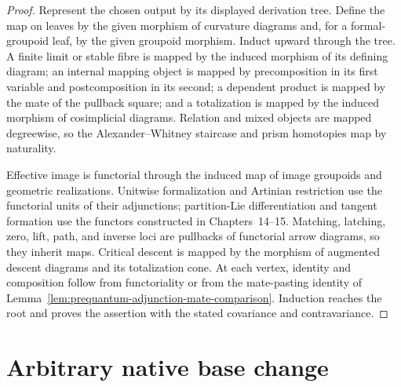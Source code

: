 \begin{proof}
Represent the chosen output by its displayed derivation tree.  Define the map on
leaves by the given morphism of curvature diagrams and, for a formal-groupoid
leaf, by the given groupoid morphism.  Induct upward through the tree.  A finite
limit or stable fibre is mapped by the induced morphism of its defining diagram;
an internal mapping object is mapped by precomposition in its first variable and
postcomposition in its second; a dependent product is mapped by the mate of the
pullback square; and a totalization is mapped by the induced morphism of
cosimplicial diagrams.  Relation and mixed objects are mapped degreewise, so the
Alexander--Whitney staircase and prism homotopies map by naturality.

Effective image is functorial through the induced map of image groupoids and
geometric realizations.  Unitwise formalization and Artinian restriction use the
functorial units of their adjunctions; partition-Lie differentiation and tangent
formation use the functors constructed in Chapters~14--15.  Matching, latching,
zero, lift, path, and inverse loci are pullbacks of functorial arrow diagrams, so
they inherit maps.  Critical descent is mapped by the morphism of augmented
descent diagrams and its totalization cone.  At each vertex, identity and
composition follow from functoriality or from the mate-pasting identity of
Lemma~\ref{lem:prequantum-adjunction-mate-comparison}.  Induction reaches the
root and proves the assertion with the stated covariance and contravariance.
\end{proof}

\section{Arbitrary native base change}
\label{sec:prequantum-arbitrary-base-change}

